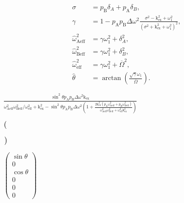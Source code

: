 \documentclass[a4paper,11pt,twoside,openright]{book}
\def\lthtmlcheckvsize{\ifdim\ht\sizebox<\vsize 
  \ifdim\wd\sizebox<\hsize\expandafter\hfill\fi \expandafter\vfill
  \else\expandafter\vss\fi}%
\begin{document}
{\newpage\clearpage
\setcounter{equation}{78}
%
\begin{subequations}\begin{align}
\sigma &= p_{\textrm{B}}\delta_A + p_{\textrm{A}}\delta_B, \\
\gamma &= 1 - p_{\textrm{A}}p_{\textrm{B}}\Delta\omega ^2 \frac{\sigma^2 - \textrm{k}_{\textrm{ex}}^2 + \omega_1 ^2}{\left( \sigma^2 + \textrm{k}_{\textrm{ex}}^2 + \omega_1 ^2 \right)^2}, \\
\hat\omega_{\textrm{Aeff}}^2 &= \gamma\omega_1 ^2 + \delta_A^2, \\
\hat\omega_{\textrm{Beff}}^2 &= \gamma\omega_1 ^2 + \delta_B^2, \\
\hat\omega_{\textrm{eff}}^2 &= \gamma\omega_1 ^2 + \overline{\Omega}^2, \\
\hat\theta &= \arctan \left( \frac{\sqrt{\gamma}\omega_1 }{\overline{\Omega}} \right).
\end{align}\end{subequations}%
\lthtmldisplayZ
\lthtmlcheckvsize\clearpage}

{\newpage\clearpage
{}%
$\displaystyle {\frac{{\sin^2\theta p_{\textrm{A}}p_{\textrm{B}}\Delta\omega ^2\textrm{k}_{\textrm{ex}}}}{{\omega_{\textrm{Aeff}}^2\omega_{\textrm{Beff}}^2/\omega_{\textrm{eff}}^2 + \textrm{k}_{\textrm{ex}}^2 - \sin^2\theta p_{\textrm{A}}p_{\textrm{B}}\Delta\omega ^2 \left(
1 + \frac{2\textrm{k}_{\textrm{ex}}^2 \left( p_{\textrm{A}}\omega_{\textrm{Aeff}}^2 + p_{\textrm{B}}\omega_{\textrm{Beff}}^2 \right)}{\omega_{\textrm{Aeff}}^2\omega_{\textrm{Beff}}^2 + \omega_{\textrm{eff}}^2\textrm{k}_{\textrm{ex}}^2}
\right)}}}$%
\lthtmlindisplaymathZ
\lthtmlcheckvsize\clearpage}

{\newpage\clearpage
{}%
$\displaystyle \left(\vphantom{ M_0^T \cdot e^{R \cdot T_{\textrm{relax}}} \cdot M_0 }\right.$%
\lthtmlindisplaymathZ
\lthtmlcheckvsize\clearpage}

{\newpage\clearpage
{}%
$\displaystyle \left.\vphantom{ M_0^T \cdot e^{R \cdot T_{\textrm{relax}}} \cdot M_0 }\right)$%
\lthtmlindisplaymathZ
\lthtmlcheckvsize\clearpage}

{\newpage\clearpage
{}%
$\displaystyle \begin{pmatrix} \sin{\theta} \\0 \\\cos{\theta} \\0 \\0 \\0  \end{pmatrix}$%
\lthtmlindisplaymathZ
\lthtmlcheckvsize\clearpage}
\end{document}

